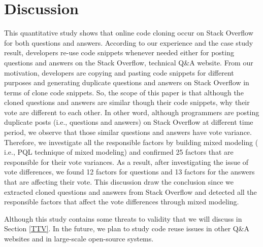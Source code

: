 \documentclass[conference]{IEEEtran}
\begin{document}
 \section{Discussion}
This quantitative study shows that online code cloning occur on Stack Overflow for both questions and answers. According to our experience and the case study result, developers re-use code snippets whenever needed either for posting questions and answers on the Stack Overflow, technical Q\&A website. From our motivation, developers are copying and pasting code snippets for different purposes and generating duplicate questions and answers on Stack Overflow in terms of clone code snippets. So, the scope of this paper is that although the cloned questions and answers are similar though their code snippets, why their vote are different to each other. In other word, although programmers are posting duplicate posts (i.e., questions and answers) on Stack Overflow at different time period, we observe that those similar questions and answers have vote variance. Therefore, we investigate all the responsible factors by building mixed modeling ( i.e., PQL technique of mixed modeling) and confirmed 25 factors that are responsible for their vote variances. As a result, after investigating the issue of vote differences, we found 12 factors for questions and 13 factors for the answers that are affecting their vote. This discussion draw the conclusion since we extracted cloned questions and answers from Stack Overflow and detected all the responsible factors that affect the vote differences through mixed modeling.\newline     


Although this study contains some threats to validity that we will discuss in Section \ref{TTV}. In the future, we plan to study code reuse issues in other Q\&A websites and in large-scale open-source systems.
\end{document}

